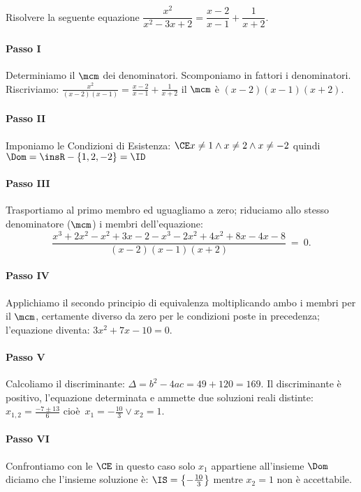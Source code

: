  \begin{esempio}
Risolvere la seguente equazione \(\dfrac{x^{2}}{x^{2} - 3 x + 2}=\dfrac{x - 2}{x 
- 1} +\dfrac{1}{x + 2}\).
 \paragraph{Passo I} Determiniamo il \(\mcm\) dei denominatori. Scomponiamo in 
fattori i denominatori. Riscriviamo: \(\frac{x^{2}}{( x - 2 ) ( x - 1 )}=\frac{x 
- 2}{x - 1} +\frac{1}{x + 2}\) il \(\mcm\) è \(( x - 2 ) ( x - 1 ) ( x + 2 )\).
 \paragraph{Passo II} Imponiamo le Condizioni di Esistenza: \(\CE x \neq 1 
\wedge 
x \neq 2 \wedge x \neq - 2\) quindi \(\Dom = \insR - \{ 1, 2, - 2 \}=\ID\)
 \paragraph{Passo III} Trasportiamo al primo membro ed uguagliamo a zero; 
riduciamo allo stesso denominatore (\(\mcm\)) i membri dell'equazione: 
\[\frac{x^{3} + 2 x^{2} - x^{2} + 3 x - 2 - x^{3} - 2 x^{2} + 4x^{2} + 8 x - 4 
x 
- 8}{( x - 2 ) ( x - 1 ) ( x + 2 )}~=~0.\]
 \paragraph{Passo IV} Applichiamo il secondo principio di equivalenza 
moltiplicando ambo i membri per il \(\mcm\), certamente diverso da zero per le 
condizioni poste in precedenza; l'equazione diventa: \(3 x^{2} + 7 x - 10 = 0\).
 \paragraph{Passo V} Calcoliamo il discriminante: \(\Delta=b^{2} - 4 a c=49 + 
120=169\). Il discriminante è positivo, l'equazione determinata e ammette due 
soluzioni reali distinte: \(x_{1,2}=\frac{- 7 \pm 13}{6}\) 
cioè~\(x_{1}=-\frac{10}{3} \vee x_{2}=1\).
 \paragraph{Passo VI} Confrontiamo con le \(\CE\) in questo caso solo \(x_{1}\) 
appartiene all'insieme \(\Dom\) diciamo che l'insieme soluzione è: 
\(\IS=\left\{-\frac{10}{3}\right\}\) mentre \(x_{2} = 1\) non è accettabile.
\end{esempio}
